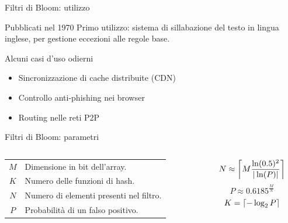 \documentclass{beamer}
\DeclarePairedDelimiter{\ceil}{\lceil}{\rceil}
\begin{document}
	\begin{frame}{Filtri di Bloom: utilizzo}

	  	\begin{block}{Pubblicati nel 1970}
	  	Primo utilizzo: sistema di sillabazione del testo in lingua inglese,
	  	per gestione eccezioni alle regole base.
	  	\end{block}

	  	\begin{block}{Alcuni casi d'uso odierni}
	  	\begin{itemize}
	  		\item Sincronizzazione di cache distribuite (CDN)
	  		\item Controllo anti-phishing nei browser
	  		\item Routing nelle reti P2P
	  	\end{itemize}
	  	\end{block}

	\end{frame}


	\begin{frame}[fragile]{Filtri di Bloom: parametri}
	\begin{columns}[c]
		\begin{column}{6cm}
			\begin{tabular}{cp{5cm}}
				\toprule
				$M$ & Dimensione in bit dell'array. \\
				$K$ & Numero delle funzioni di hash. \\
				$N$ & Numero di elementi presenti nel filtro. \\
				$P$ & Probabilità di un falso positivo. \\
				\bottomrule
			\end{tabular}
		\end{column}

		\begin{column}{5cm}
		$$ N \approx \ceil*{M\frac{\ln(0.5)^2}{|\ln(P)|}} $$
		$$ P \approx 0.6185^{\frac{M}{N}} $$
		$$ K = \ceil*{-\log_2{P}} $$
		\end{column}
	\end{columns}
	\end{frame}
\end{document}
